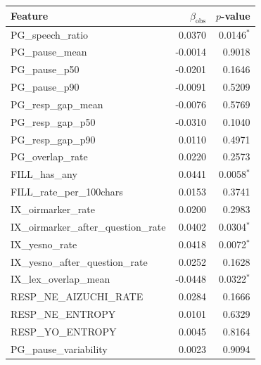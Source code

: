 \begin{tabular}{lrr}
\toprule
Feature & $\beta_{\mathrm{obs}}$ & $p$-value \\
\midrule
PG\_speech\_ratio & 0.0370 & 0.0146$^{*}$ \\
PG\_pause\_mean & -0.0014 & 0.9018 \\
PG\_pause\_p50 & -0.0201 & 0.1646 \\
PG\_pause\_p90 & -0.0091 & 0.5209 \\
PG\_resp\_gap\_mean & -0.0076 & 0.5769 \\
PG\_resp\_gap\_p50 & -0.0310 & 0.1040 \\
PG\_resp\_gap\_p90 & 0.0110 & 0.4971 \\
PG\_overlap\_rate & 0.0220 & 0.2573 \\
FILL\_has\_any & 0.0441 & 0.0058$^{*}$ \\
FILL\_rate\_per\_100chars & 0.0153 & 0.3741 \\
IX\_oirmarker\_rate & 0.0200 & 0.2983 \\
IX\_oirmarker\_after\_question\_rate & 0.0402 & 0.0304$^{*}$ \\
IX\_yesno\_rate & 0.0418 & 0.0072$^{*}$ \\
IX\_yesno\_after\_question\_rate & 0.0252 & 0.1628 \\
IX\_lex\_overlap\_mean & -0.0448 & 0.0322$^{*}$ \\
RESP\_NE\_AIZUCHI\_RATE & 0.0284 & 0.1666 \\
RESP\_NE\_ENTROPY & 0.0101 & 0.6329 \\
RESP\_YO\_ENTROPY & 0.0045 & 0.8164 \\
PG\_pause\_variability & 0.0023 & 0.9094 \\
\bottomrule
\end{tabular}
